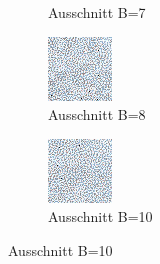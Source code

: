 \begin{figure}[H]
\begin{subfigure}[b]{0.2\linewidth}
         \caption{Ausschnitt B=7}
         \label{pic:screen_B7}
    \end{subfigure}
    \begin{subfigure}[b]{0.2\linewidth}
        \includegraphics[width=\linewidth]{content/TemporalerAlg/Bilder/Sorting/DiffDimensions/8/seed_debug_5.0_small_screen.png}
         \caption{Ausschnitt B=8}
         \label{pic:screen_B8}
    \end{subfigure}
    \begin{subfigure}[b]{0.2\linewidth}
        \includegraphics[width=\linewidth]{content/TemporalerAlg/Bilder/Sorting/DiffDimensions/10/seed_debug_5.0_small_screen.png}
         \caption{Ausschnitt B=10}
         \label{pic:screen_B10}
    \end{subfigure}


\end{figure}
